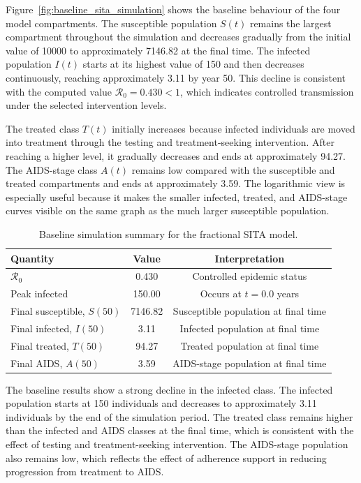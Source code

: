 \documentclass[12pt,a4paper,oneside]{report}
\begin{document}
Figure~\ref{fig:baseline_sita_simulation} shows the baseline behaviour of the four model compartments. The susceptible population $S(t)$ remains the largest compartment throughout the simulation and decreases gradually from the initial value of 10000 to approximately 7146.82 at the final time. The infected population $I(t)$ starts at its highest value of 150 and then decreases continuously, reaching approximately 3.11 by year 50. This decline is consistent with the computed value $\mathcal{R}_0=0.430<1$, which indicates controlled transmission under the selected intervention levels.

The treated class $T(t)$ initially increases because infected individuals are moved into treatment through the testing and treatment-seeking intervention. After reaching a higher level, it gradually decreases and ends at approximately 94.27. The AIDS-stage class $A(t)$ remains low compared with the susceptible and treated compartments and ends at approximately 3.59. The logarithmic view is especially useful because it makes the smaller infected, treated, and AIDS-stage curves visible on the same graph as the much larger susceptible population.

\begin{table}[H]
\centering
\caption{Baseline simulation summary for the fractional SITA model.}
\label{tab:baseline_results}
\begin{tabular}{lcc}
\toprule
Quantity & Value & Interpretation\\
\midrule
$\mathcal{R}_0$ & 0.430 & Controlled epidemic status\\
Peak infected & 150.00 & Occurs at $t=0.0$ years\\
Final susceptible, $S(50)$ & 7146.82 & Susceptible population at final time\\
Final infected, $I(50)$ & 3.11 & Infected population at final time\\
Final treated, $T(50)$ & 94.27 & Treated population at final time\\
Final AIDS, $A(50)$ & 3.59 & AIDS-stage population at final time\\
\bottomrule
\end{tabular}
\end{table}

The baseline results show a strong decline in the infected class. The infected population starts at 150 individuals and decreases to approximately 3.11 individuals by the end of the simulation period. The treated class remains higher than the infected and AIDS classes at the final time, which is consistent with the effect of testing and treatment-seeking intervention. The AIDS-stage population also remains low, which reflects the effect of adherence support in reducing progression from treatment to AIDS.
\end{document}

